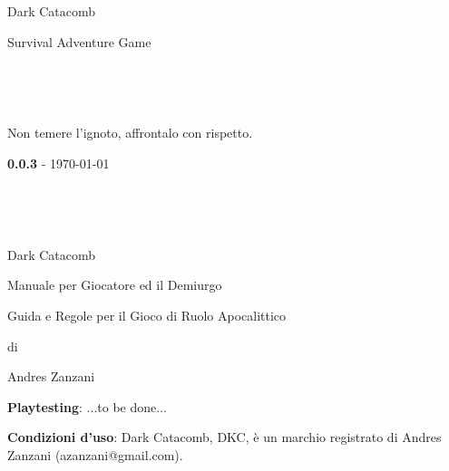 \documentclass[a4paper,twoside,openany]{book}
\begin{document}
\def \versione {0.0.3} \fontsize{12}{14}\selectfont

\thispagestyle{empty}

{\Huge \begin{center}
		Dark Catacomb
\end{center}}

\vfill
\begin{center}
	\Large{\color{black} Survival Adventure Game}
\end{center}

\newpage~\thispagestyle{empty}%

\newpage~\thispagestyle{empty}%

\bigskip
Non temere l'ignoto, affrontalo con rispetto.

	\vspace{\fill}
\begin{center}\textbf{\versione} - \today\end{center}
\thispagestyle{empty}

\newpage~\thispagestyle{empty}%

\newpage~\thispagestyle{empty}%


\newcommand{\riga}{\rule{\textwidth}{0.4pt}}


{\Huge \begin{center} Dark Catacomb\end{center}}

\bigskip

\begin{center}{\LARGE Manuale per Giocatore ed il Demiurgo}\\ \end{center}

{\large \begin{center} Guida e Regole per il Gioco di Ruolo Apocalittico \end{center}}

\begin{center}di \end{center}

{\LARGE \begin{center} Andres Zanzani \end{center}}

\vspace{2cm}


\vfill

\begin{mdframed}[roundcorner=10pt]

\medskip

\textbf{Playtesting}: ...to be done...

\bigskip

\begin{flushleft}\textbf{Condizioni d'uso}: Dark Catacomb, DKC, è un marchio registrato di Andres Zanzani (azanzani@gmail.com).
\end{flushleft}

\vspace{0.5cm}


\medskip

\end{mdframed}
\end{document}
